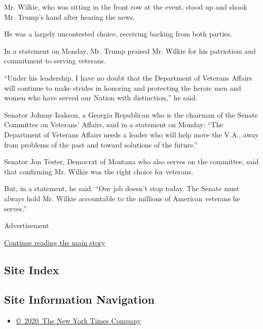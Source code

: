 Mr. Wilkie, who was sitting in the front row at the event, stood up and
shook Mr. Trump's hand after hearing the news.

He was a largely uncontested choice, receiving backing from both
parties.

In a statement on Monday, Mr. Trump praised Mr. Wilkie for his
patriotism and commitment to serving veterans.

``Under his leadership, I have no doubt that the Department of Veterans
Affairs will continue to make strides in honoring and protecting the
heroic men and women who have served our Nation with distinction,'' he
said.

Senator Johnny Isakson, a Georgia Republican who is the chairman of the
Senate Committee on Veterans' Affairs, said in a statement on Monday:
``The Department of Veterans Affairs needs a leader who will help move
the V.A., away from problems of the past and toward solutions of the
future.''

Senator Jon Tester, Democrat of Montana who also serves on the
committee, said that confirming Mr. Wilkie was the right choice for
veterans.

But, in a statement, he said: ``Our job doesn't stop today. The Senate
must always hold Mr. Wilkie accountable to the millions of American
veterans he serves.''

Advertisement

\protect\hyperlink{after-bottom}{Continue reading the main story}

\hypertarget{site-index}{%
\subsection{Site Index}\label{site-index}}

\hypertarget{site-information-navigation}{%
\subsection{Site Information
Navigation}\label{site-information-navigation}}

\begin{itemize}
\tightlist
\item
  \href{https://help.nytimes.com/hc/en-us/articles/115014792127-Copyright-notice}{©~2020~The
  New York Times Company}
\end{itemize}


